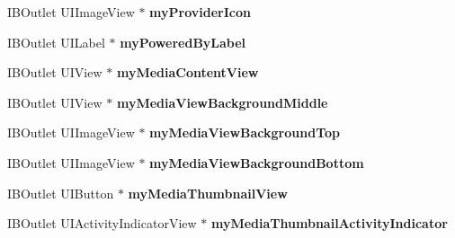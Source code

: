 \begin{DoxyCompactItemize}
\item 
\hypertarget{interface_j_r_publish_activity_controller_ae62213ecbc8a0f4cbdf7277a4cb9c31b}{
IBOutlet UIImageView $\ast$ {\bfseries myProviderIcon}}
\label{interface_j_r_publish_activity_controller_ae62213ecbc8a0f4cbdf7277a4cb9c31b}

\item 
\hypertarget{interface_j_r_publish_activity_controller_a1bc7b6922fb25c16e9c62b728974495d}{
IBOutlet UILabel $\ast$ {\bfseries myPoweredByLabel}}
\label{interface_j_r_publish_activity_controller_a1bc7b6922fb25c16e9c62b728974495d}

\item 
\hypertarget{interface_j_r_publish_activity_controller_a4430ca2744c6f840c6f603cd9ac0c28e}{
IBOutlet UIView $\ast$ {\bfseries myMediaContentView}}
\label{interface_j_r_publish_activity_controller_a4430ca2744c6f840c6f603cd9ac0c28e}

\item 
\hypertarget{interface_j_r_publish_activity_controller_a4fbf03e4dde1d18a74988ee53384cde8}{
IBOutlet UIView $\ast$ {\bfseries myMediaViewBackgroundMiddle}}
\label{interface_j_r_publish_activity_controller_a4fbf03e4dde1d18a74988ee53384cde8}

\item 
\hypertarget{interface_j_r_publish_activity_controller_aa625a43bf7572d3e160ba76611904e35}{
IBOutlet UIImageView $\ast$ {\bfseries myMediaViewBackgroundTop}}
\label{interface_j_r_publish_activity_controller_aa625a43bf7572d3e160ba76611904e35}

\item 
\hypertarget{interface_j_r_publish_activity_controller_af43f8b9935bfc817728528e6626aa0e2}{
IBOutlet UIImageView $\ast$ {\bfseries myMediaViewBackgroundBottom}}
\label{interface_j_r_publish_activity_controller_af43f8b9935bfc817728528e6626aa0e2}

\item 
\hypertarget{interface_j_r_publish_activity_controller_a79cec1afbea8f8a331487d1490be6f8f}{
IBOutlet UIButton $\ast$ {\bfseries myMediaThumbnailView}}
\label{interface_j_r_publish_activity_controller_a79cec1afbea8f8a331487d1490be6f8f}

\item 
\hypertarget{interface_j_r_publish_activity_controller_a07515c2dfb5e41ba67fa7e74202b183c}{
IBOutlet UIActivityIndicatorView $\ast$ {\bfseries myMediaThumbnailActivityIndicator}}
\label{interface_j_r_publish_activity_controller_a07515c2dfb5e41ba67fa7e74202b183c}


\end{DoxyCompactItemize}
